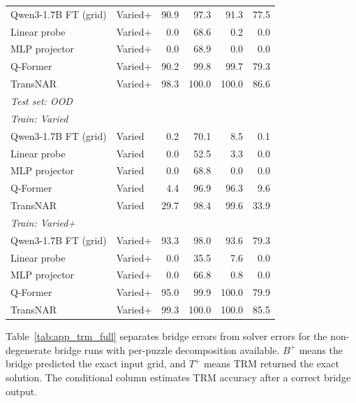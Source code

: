\documentclass[11pt]{article}
\begin{document}
\begin{table}[t]
\begin{tabular}{llrrrr}
Qwen3-1.7B FT (grid) & Varied+ & 90.9 & 97.3 & 91.3 & 77.5 \\
Linear probe  & Varied+ & 0.0 & 68.6 & 0.2 & 0.0 \\
MLP projector & Varied+ & 0.0 & 68.9 & 0.0 & 0.0 \\
Q-Former      & Varied+ & 90.2 & 99.8 & 99.7 & 79.3 \\
TransNAR      & Varied+ & 98.3 & 100.0 & 100.0 & 86.6 \\
\midrule
\multicolumn{6}{l}{\textit{Test set: OOD}} \\
\midrule
\multicolumn{6}{l}{\textit{Train: Varied}} \\
Qwen3-1.7B FT (grid) & Varied  & 0.2 & 70.1 & 8.5 & 0.1 \\
Linear probe  & Varied  & 0.0 & 52.5 & 3.3 & 0.0 \\
MLP projector & Varied  & 0.0 & 68.8 & 0.0 & 0.0 \\
Q-Former      & Varied  & 4.4 & 96.9 & 96.3 & 9.6 \\
TransNAR      & Varied  & 29.7 & 98.4 & 99.6 & 33.9 \\
\multicolumn{6}{l}{\textit{Train: Varied+}} \\
Qwen3-1.7B FT (grid) & Varied+ & 93.3 & 98.0 & 93.6 & 79.3 \\
Linear probe  & Varied+ & 0.0 & 35.5 & 7.6 & 0.0 \\
MLP projector & Varied+ & 0.0 & 66.8 & 0.8 & 0.0 \\
Q-Former      & Varied+ & 95.0 & 99.9 & 100.0 & 79.9 \\
TransNAR      & Varied+ & 99.3 & 100.0 & 100.0 & 85.5 \\
\bottomrule
\end{tabular}
\end{table}

Table~\ref{tab:app_trm_full} separates bridge errors from solver errors for the non-degenerate bridge runs with per-puzzle decomposition available.
$B^+$ means the bridge predicted the exact input grid, and $T^+$ means TRM returned the exact solution.
The conditional column estimates TRM accuracy after a correct bridge output.
\end{document}
